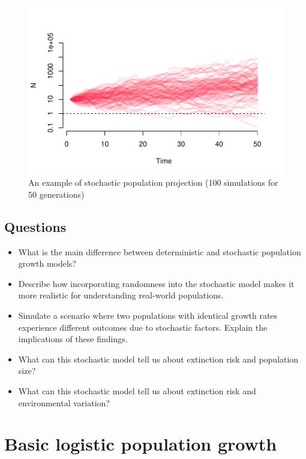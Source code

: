 \documentclass[
  a4paper]{book}
\providecommand{\tightlist}{%
  \setlength{\itemsep}{0pt}\setlength{\parskip}{0pt}}
\begin{document}
\begin{figure}

{\centering \includegraphics{BB512_files/figure-latex/stochProjection-1} 

}

\caption{An example of stochastic population projection (100 simulations for 50 generations)}\label{fig:stochProjection}
\end{figure}

\section{Questions}\label{questions-4}

\begin{itemize}
\tightlist
\item
  What is the main difference between deterministic and stochastic population growth models?
\item
  Describe how incorporating randomness into the stochastic model makes it more realistic for understanding real-world populations.
\item
  Simulate a scenario where two populations with identical growth rates experience different outcomes due to stochastic factors. Explain the implications of these findings.
\item
  What can this stochastic model tell us about extinction risk and population size?
\item
  What can this stochastic model tell us about extinction risk and environmental variation?
\end{itemize}

\chapter{Basic logistic population growth}\label{basic-logistic-population-growth}
\end{document}
